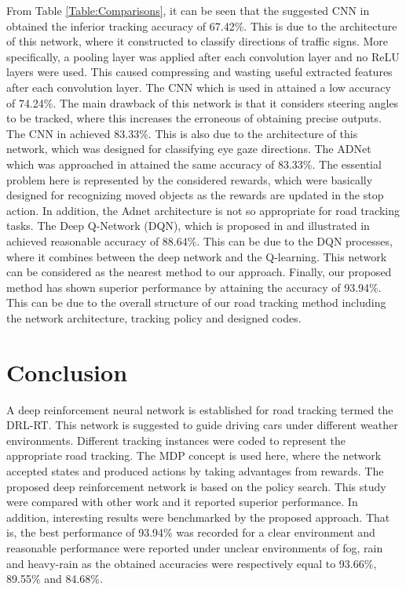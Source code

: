 \documentclass{svproc}
\begin{document}
From Table \ref{Table:Comparisons}, it can be seen that the suggested CNN in \cite{Karaduman2017Deep} obtained the inferior tracking accuracy of 67.42\%. This is due to the architecture of this network, where it constructed to classify directions of traffic signs. More specifically, a pooling layer was applied after each convolution layer and no ReLU layers were used. This caused compressing and wasting useful extracted features after each convolution layer. The CNN which is used in \cite{bojarski2016end} attained a low accuracy of 74.24\%. The main drawback of this network is that it considers steering angles to be tracked, where this increases the erroneous of obtaining precise outputs. The CNN in \cite{George2016Real} achieved 83.33\%. This is also due to the architecture of this network, which was designed for classifying eye gaze directions. The ADNet which was approached in \cite{Yun2017Action,Yun2018Action} attained the same accuracy of 83.33\%. 
The essential problem here is represented by the considered rewards, which were basically designed %
for recognizing moved objects as the rewards are updated in the stop action. In addition, the Adnet architecture is not so appropriate for road tracking tasks. The Deep Q-Network (DQN), which is proposed in \cite{mnih2015human} and illustrated in \cite{arulkumaran2017brief} achieved reasonable accuracy of 88.64\%. This can be due to the DQN processes, where it combines between the deep network and the Q-learning. This network can be considered as the nearest method to our approach. Finally, our proposed method has shown superior performance by attaining the accuracy of 93.94\%. This can be due to the overall structure of our road tracking method including the network architecture, tracking policy and designed codes.

\section{Conclusion}
A deep reinforcement neural network is established for road tracking termed the DRL-RT. This network is suggested to guide driving cars under different weather environments. Different tracking instances were coded to represent the appropriate road tracking. The MDP concept is used here, where the network accepted states and produced actions by taking advantages from rewards. The proposed deep reinforcement network is based on the policy search. This study were compared with other work and it reported superior performance. In addition, interesting results were benchmarked by the proposed approach. That is, the best performance of 93.94\% was recorded for a clear environment and reasonable performance were reported under unclear environments of fog, rain and heavy-rain as the obtained accuracies were respectively equal to 93.66\%, 89.55\% and 84.68\%. 
\end{document}
